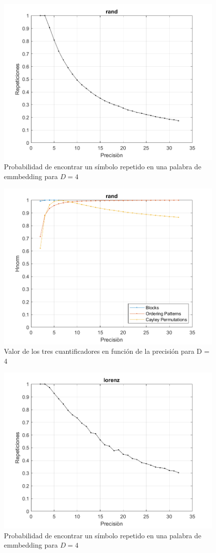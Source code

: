 \documentclass[twocolumn]{article}
\begin{document}
\begin{figure}[h]
  \centering
  \includegraphics[width=.5\textwidth]{randReps.png}
  \caption{Probabilidad de encontrar un símbolo repetido en una palabra de emmbedding para $D = 4$}
  \label{fig:randReps}
\end{figure}
\begin{figure}[h]
  \centering
  \includegraphics[width=.5\textwidth]{randCuantis.png}
  \caption{Valor de los tres cuantificadores en función de la precisión para D = 4}
  \label{fig:randCuantis}
\end{figure}
\begin{figure}[h]
  \centering
  \includegraphics[width=.5\textwidth]{lorenzReps.png}
  \caption{Probabilidad de encontrar un símbolo repetido en una palabra de emmbedding para $D = 4$}
  \label{fig:lorenzReps}
\end{figure}
\end{document}
